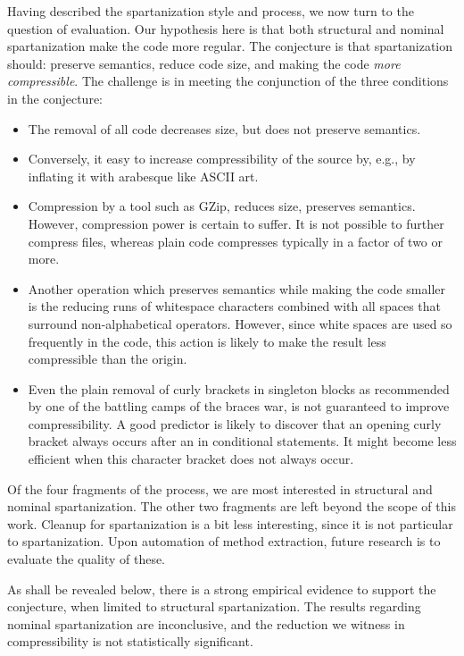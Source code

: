 Having described the spartanization style and process, we now turn to the
question of evaluation. Our hypothesis here is that both structural and
nominal spartanization make the code more regular. The conjecture is that
spartanization should: preserve semantics, reduce code size, and making the
code \emph{more compressible}. The challenge is in meeting the conjunction of
the three conditions in the conjecture:
\begin{itemize}
    \item The removal of all code decreases size, but does not preserve semantics.
    \item Conversely, it easy to increase compressibility of the source
      by, e.g., by inflating it with arabesque like ASCII art.
    \item Compression by a tool such as GZip, reduces size, preserves
      semantics. However, compression power is certain to suffer. It is
      not possible to further compress  files, whereas plain code
      compresses typically in a factor of two or more.
    \item Another operation which preserves semantics while making
      the code smaller is the reducing runs of whitespace characters combined
      with all spaces that surround non-alphabetical operators.
      However, since white spaces are used so frequently in the code,
      this action is likely to make the result less compressible than the origin.
    \item Even the plain removal of curly brackets in singleton blocks as
      recommended by one of the battling camps of the braces war, is not guaranteed
      to improve compressibility. A good predictor is likely to discover that
      an opening curly bracket always occurs after an  in conditional statements.
      It might become less efficient when this character bracket does not always occur.
\end{itemize}

Of the four fragments of the process, we are most interested in structural and
nominal spartanization. The other two fragments are left beyond the scope of
this work. Cleanup for spartanization is a bit less interesting, since it is
not particular to spartanization. Upon automation of method extraction, future
research is to evaluate the quality of these.

As shall be revealed below, there is a strong empirical evidence to support
the conjecture, when limited to structural spartanization. The results
regarding nominal spartanization are inconclusive, and the reduction we witness
in compressibility is not statistically significant.

